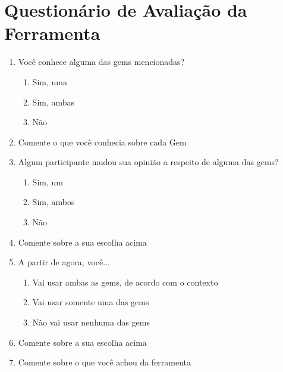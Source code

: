 \chapter{Questionário de Avaliação da Ferramenta}
\begin{enumerate}
  
  \item \hspace{1pt} Você conhece alguma das gems mencionadas?
    \begin{enumerate}
		\item \hspace{1pt} Sim, uma
        \item \hspace{1pt} Sim, ambas
        \item \hspace{1pt} Não
	\end{enumerate}
    
  \item \hspace{1pt} Comente o que você conhecia sobre cada Gem
  
  \item \hspace{1pt} Algum participante mudou sua opinião a respeito de alguma das gems?
  	\begin{enumerate}
  		\item \hspace{1pt} Sim, um
        \item \hspace{1pt} Sim, ambos
        \item \hspace{1pt} Não
    \end{enumerate}
  
  \item \hspace{1pt} Comente sobre a sua escolha acima
  
  \item \hspace{1pt} A partir de agora, você...
    \begin{enumerate}
  		\item \hspace{1pt} Vai usar ambas as gems, de acordo com o contexto
        \item \hspace{1pt} Vai usar somente uma das gems
        \item \hspace{1pt} Não vai usar nenhuma das gems
    \end{enumerate}
  
  \item \hspace{1pt} Comente sobre a sua escolha acima
  
  \item \hspace{1pt} Comente sobre o que você achou da ferramenta		

\end{enumerate}


